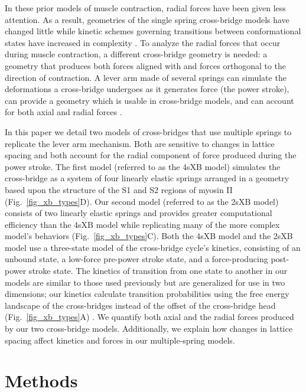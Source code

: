 \documentclass[]{article}
\begin{document}
In these prior models of muscle contraction, radial forces have been given less attention. 
As a result, geometries of the single spring cross-bridge models have changed little while kinetic schemes governing transitions between conformational states have increased in complexity \citep{Huxley1957, Pate1989, Daniel1998, Smith2008a}. %
To analyze the radial forces that occur during muscle contraction, a different cross-bridge geometry is needed: a geometry that produces both forces aligned with and forces orthogonal to the direction of contraction. 
A lever arm made of several springs can simulate the deformations a cross-bridge undergoes as it generates force (the power stroke), can provide a geometry which is usable in cross-bridge models, and can account for both axial and radial forces \citep{Houdusse2001}.  

In this paper we detail two models of cross-bridges that use multiple springs to replicate the lever arm mechanism.  
Both are sensitive to changes in lattice spacing and both account for the radial component of force produced during the power stroke.  
The first model (referred to as the 4sXB model) simulates the cross-bridge as a system of four linearly elastic springs arranged in a geometry based upon the structure of the S1 and S2 regions of myosin II (Fig.~\ref{fig_xb_types}D).  
Our second model (referred to as the 2sXB model) consists of two linearly elastic springs and provides greater computational efficiency than the 4sXB model while replicating many of the more complex model's behaviors (Fig.~\ref{fig_xb_types}C). 
Both the 4sXB model and the 2sXB model use a three-state model of the cross-bridge cycle's kinetics, consisting of an unbound state, a low-force pre-power stroke state, and a force-producing post-power stroke state. 
The kinetics of transition from one state to another in our models are similar to those used previously but are generalized for use in two dimensions; our kinetics calculate transition probabilities using the free energy landscape of the cross-bridges instead of the offset of the cross-bridge head (Fig.~\ref{fig_xb_types}A) \citep{Pate1989, Daniel1998, Tanner2007}. 
We quantify both axial and the radial forces produced by our two cross-bridge models. 
Additionally, we explain how changes in lattice spacing affect kinetics and forces in our multiple-spring models. 


\section*{Methods}  %
\end{document}
